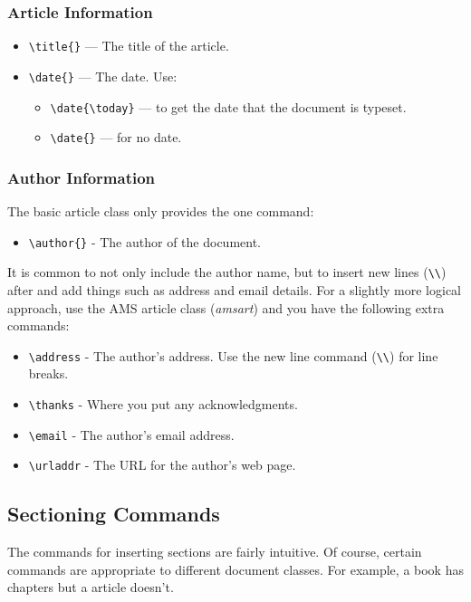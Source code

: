 \documentclass{article}
\begin{document}
\subsubsection{Article Information}
\begin{itemize}
\item \verb|\title{}| --- The title of the article.
\item \verb|\date{}| --- The date. Use:
  \begin{itemize}
  \item \verb|\date{\today}| --- to get the date that the document is typeset.
  \item \verb|\date{}| --- for no date.
  \end{itemize}
\end{itemize}

\subsubsection{Author Information}
The basic article class only provides the one command:
\begin{itemize}
\item \verb|\author{}| - The author of the document.
\end{itemize}

It is common to not only include the author name, but to insert new
lines (\verb|\\|) after and add things such
as address and email details.  For a slightly more logical approach, use
the AMS article class (\emph{amsart}) and you have the following extra
commands:

\begin{itemize}
\item \verb|\address| - The author's address.  Use the new line command (\verb|\\|) for line breaks.
\item \verb|\thanks| - Where you put any acknowledgments.
\item \verb|\email| - The author's email address.
\item \verb|\urladdr| - The URL for the author's web page.
\end{itemize}

\subsection{Sectioning Commands}
The commands for inserting sections are fairly intuitive.  Of course,
certain commands are appropriate to different document classes.
For example, a book has chapters but a article doesn't.
\end{document}
